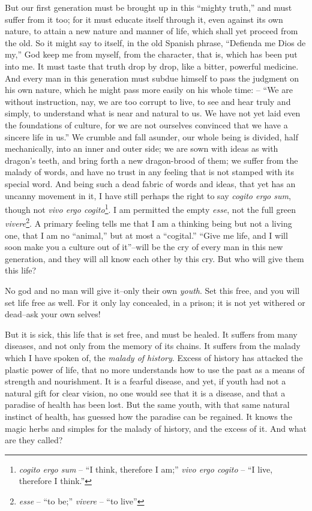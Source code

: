 But our first generation must be brought up in this \enquote{mighty truth,}
and must suffer from it too; for it must educate itself through it,
even against its own nature, to attain a new nature and manner of
life, which shall yet proceed from the old. So it might say to
itself, in the old Spanish phrase, \enquote{Defienda me Dios de my,} God keep
me from myself, from the character, that is, which has been put into
me. It must taste that truth drop by drop, like a bitter, powerful
medicine. And every man in this generation must subdue himself to
pass the judgment on his own nature, which he might pass more easily
on his whole time: -- \enquote{We are without instruction, nay, we are too
corrupt to live, to see and hear truly and simply, to understand what
is near and natural to us. We have not yet laid even the foundations
of culture, for we are not ourselves convinced that we have a sincere
life in us.} We crumble and fall asunder, our whole being is divided,
half mechanically, into an inner and outer side; we are sown with
ideas as with dragon's teeth, and bring forth a new dragon-brood of
them; we suffer from the malady of words, and have no trust in any
feeling that is not stamped with its special word. And being such a
dead fabric of words and ideas, that yet has an uncanny movement in
it, I have still perhaps the right to say \textit{cogito ergo sum}, though
not \textit{vivo ergo cogito}\footnote{
\textit{cogito ergo sum} -- \enquote{I think, therefore I am;} \textit{vivo ergo cogito} -- \enquote{I live, therefore I think.}}. I am permitted the empty \textit{esse}, not the full
green \textit{vivere}\footnote{\textit{esse} -- \enquote{to be;} \textit{vivere} -- \enquote{to live}}. A primary feeling tells me that I am a thinking being
but not a living one, that I am no \enquote{animal,} but at most a \enquote{cogital.}
\enquote{Give me life, and I will soon make you a culture out of it}--will be
the cry of every man in this new generation, and they will all know
each other by this cry. But who will give them this life?

No god and no man will give it--only their own \textit{youth}. Set this
free, and you will set life free as well. For it only lay concealed,
in a prison; it is not yet withered or dead--ask your own selves!

But it is sick, this life that is set free, and must be healed. It
suffers from many diseases, and not only from the memory of its
chains. It suffers from the malady which I have spoken of, the
\textit{malady of history}. Excess of history has attacked the plastic power
of life, that no more understands how to use the past as a means of
strength and nourishment. It is a fearful disease, and yet, if youth
had not a natural gift for clear vision, no one would see that it is
a disease, and that a paradise of health has been lost. But the same
youth, with that same natural instinct of health, has guessed how the
paradise can be regained. It knows the magic herbs and simples for
the malady of history, and the excess of it. And what are they
called?

